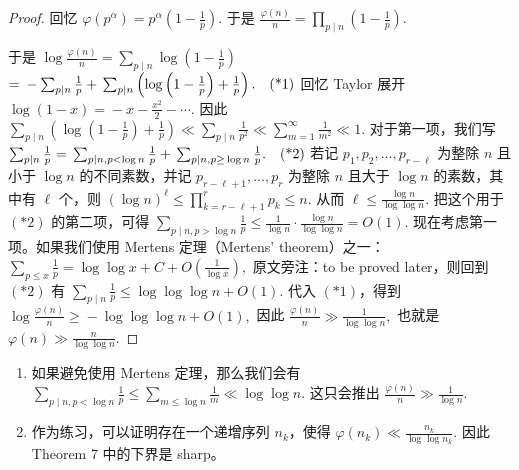 \begin{proof}
	回忆
	\(\textstyle \varphi(p^\alpha)=\allowbreak{}p^\alpha\left(1-\frac1p\right).\)
	于是
	\(\textstyle \frac{\varphi(n)}n =\allowbreak{} \prod_{p\mid\allowbreak{} n}\left(1-\frac1p\right).\)

	于是
	\(\textstyle \log\frac{\varphi(n)}n =\allowbreak{} \sum_{p\mid\allowbreak{} n}\log\left(1-\frac1p\right)\) \(\textstyle =\allowbreak{} -\sum_{p\mid\allowbreak{} n}\frac1p +\allowbreak{} \sum_{p\mid\allowbreak{} n} \left(\log\left(1-\frac1p\right)+\allowbreak{}\frac1p\right). \quad\textup{(*1)}\)
	回忆 Taylor 展开
	\(\textstyle \log(1-x)=\allowbreak{}-x-\frac{x^2}{2}-\cdots.\)
	因此
	\(\textstyle \sum_{p\mid\allowbreak{} n} \left(\log\left(1-\frac1p\right)+\allowbreak{}\frac1p\right) \ll\allowbreak{} \sum_{p\mid\allowbreak{} n}\frac1{p^2} \ll\allowbreak{} \sum_{m=\allowbreak{}1}^\infty\frac1{m^2} \ll\allowbreak{} 1.\)
	对于第一项，我们写
	\(\textstyle \sum_{p\mid\allowbreak{} n}\frac1p =\allowbreak{} \sum_{p\mid\allowbreak{} n,\allowbreak{} p<\log n}\frac1p +\allowbreak{} \sum_{p\mid\allowbreak{} n,\allowbreak{} p\geq\allowbreak{} \log n}\frac1p. \quad\textup{(*2)}\)
	若记 $p_1,p_2,\ldots,p_{r-\ell}$ 为整除 $n$ 且小于 $\log n$ 的不同素数，并记
	\(\textstyle p_{r-\ell+\allowbreak{}1},\allowbreak{}\ldots,\allowbreak{}p_r\)
	为整除 $n$ 且大于 $\log n$ 的素数，其中有 $\ell$ 个，则
	\(\textstyle (\log n)^\ell \leq\allowbreak{} \prod_{k=\allowbreak{}r-\ell+\allowbreak{}1}^r p_k \leq\allowbreak{} n.\)
	从而
	\(\textstyle \ell\leq\allowbreak{} \frac{\log n}{\log\log n}.\)
	把这个用于 $(*2)$ 的第二项，可得
	\(\textstyle \sum_{p\mid\allowbreak{} n,\allowbreak{} p>\log n}\frac1p \leq\allowbreak{} \frac1{\log n}\cdot \frac{\log n}{\log\log n} =\allowbreak{} O(1).\)
	现在考虑第一项。如果我们使用 Mertens 定理（Mertens' theorem）之一：
	\(\textstyle \sum_{p\leq\allowbreak{} x}\frac1p =\allowbreak{} \log\log x+\allowbreak{}C+\allowbreak{}O\left(\frac1{\log x}\right),\allowbreak{}\)
	原文旁注：to be proved later，则回到 $(*2)$ 有
	\(\textstyle \sum_{p\mid\allowbreak{} n}\frac1p \leq\allowbreak{} \log\log\log n+\allowbreak{}O(1).\)
	代入 $(*1)$，得到
	\(\textstyle \log\frac{\varphi(n)}n \geq\allowbreak{} -\log\log\log n+\allowbreak{}O(1),\allowbreak{}\)
	因此
	\(\textstyle \frac{\varphi(n)}n\gg\allowbreak{} \frac1{\log\log n},\allowbreak{}\)
	也就是
	\(\textstyle \varphi(n)\gg\allowbreak{} \frac{n}{\log\log n}.\)
\end{proof}

\begin{remark}
	\begin{enumerate}[label=(\alph*)]
		\item 如果避免使用 Mertens 定理，那么我们会有
		\(\textstyle \sum_{p\mid\allowbreak{} n,\allowbreak{} p<\log n}\frac1p \leq\allowbreak{} \sum_{m\leq\allowbreak{} \log n}\frac1m \ll\allowbreak{} \log\log n.\)
		这只会推出
		\(\textstyle \frac{\varphi(n)}n\gg\allowbreak{} \frac1{\log n}.\)
		\item 作为练习，可以证明存在一个递增序列 $n_k$，使得
		\(\textstyle \varphi(n_k)\ll\allowbreak{} \frac{n_k}{\log\log n_k}.\)
		因此 Theorem 7 中的下界是 sharp。
	\end{enumerate}
\end{remark}

